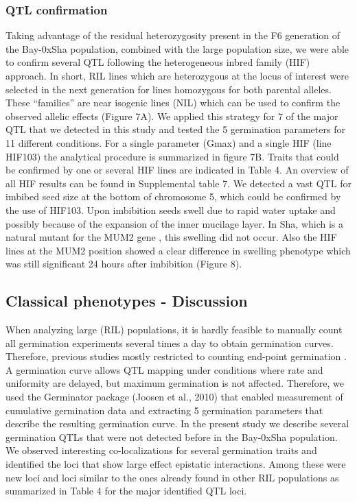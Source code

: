 \documentclass[8pt, twoside, a5paper]{report}
\begin{document}
\subsubsection{QTL confirmation}
Taking advantage of the residual heterozygosity present in the F6 generation of the Bay-0xSha population, combined with the large population size, 
we were able to confirm several QTL following the heterogeneous inbred family (HIF) approach. In short, RIL lines which are heterozygous at the 
locus of interest were selected in the next generation for lines homozygous for both parental alleles. These “families” are near isogenic lines 
(NIL) which can be used to confirm the observed allelic effects (Figure 7A). We applied this strategy for 7 of the major QTL that we detected in 
this study and tested the 5 germination parameters for 11 different conditions. For a single parameter (Gmax) and a single HIF (line HIF103) the 
analytical procedure is summarized in figure 7B. Traits that could be confirmed by one or several HIF lines are indicated in Table 4. An overview
of all HIF results can be found in Supplemental table 7. We detected a vast QTL for imbibed seed size at the bottom of chromosome 5, which could 
be confirmed by the use of HIF103. Upon imbibition seeds swell due to rapid water uptake and possibly because of the expansion of the inner 
mucilage layer. In Sha, which is a natural mutant for the MUM2 gene \cite{Macquet:2007}, this swelling did not occur. Also the HIF lines at the
MUM2 position showed a clear difference in swelling phenotype which was still significant 24 hours after imbibition (Figure 8).

\subsection{Classical phenotypes - Discussion}
When analyzing large (RIL) populations, it is hardly feasible to manually count all germination experiments several times a day to obtain germination curves. Therefore,
previous studies mostly restricted to counting end-point germination \cite{Quesada:2002, Alonso-Blanco:2003, Clerkx:2004, Laserna:2008, Meng:2008, Bentsink:2010, Galpaz:2010, Vallejo:2010}. 
A germination curve allows QTL mapping under conditions where rate and uniformity are
delayed, but maximum germination is not affected. Therefore, we used the Germinator package (Joosen et al., 2010) that enabled measurement of cumulative germination data
and extracting 5 germination parameters that describe the resulting germination curve. In the present study we describe several germination QTLs that were not detected before in
the Bay-0xSha population. We observed interesting co-localizations for several germination traits and identified the loci that show large effect epistatic interactions.
Among these were new loci and loci similar to the ones already found in other RIL populations as summarized in Table 4 for the major identified QTL loci.
\end{document}
